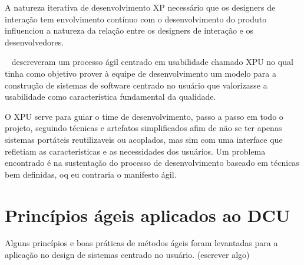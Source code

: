 	A natureza iterativa de desenvolvimento XP necessário que os designers de interação tem envolvimento contínuo com o desenvolvimento do produto influenciou a natureza da relação entre os designers de interação e os desenvolvedores.

	~ descreveram um processo ágil centrado em usabilidade chamado XPU no qual tinha como objetivo prover à equipe de desenvolvimento um modelo para a construção de sistemas de software centrado no usuário que valorizasse a usabilidade como característica fundamental da qualidade. 

	O XPU serve para guiar o time de desenvolvimento, passo a passo em todo o projeto, seguindo técnicas e artefatos simplificados afim de não se ter apenas sistemas portáteis reutilizaveis ou acoplados, mas sim com uma interface que refletiam as características e as necessidades dos usuários. Um problema encontrado é na sustentação do processo de desenvolvimento baseado em técnicas bem definidas, oq eu contraria o manifesto ágil.








\section{Princípios ágeis aplicados ao DCU}

	Alguns princípios e boas práticas de métodos ágeis foram levantadas para a aplicação no design de sistemas centrado no usuário. (escrever algo)

